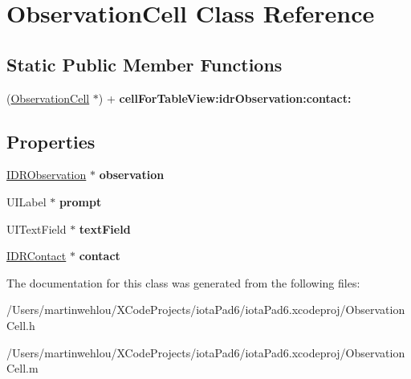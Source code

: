 \hypertarget{interface_observation_cell}{
\section{ObservationCell Class Reference}
\label{interface_observation_cell}
}
\subsection*{Static Public Member Functions}
\begin{DoxyCompactItemize}
\item 
\hypertarget{interface_observation_cell_a0782f3a18fd9c0132893a3fe97bd4f75}{
(\hyperlink{interface_observation_cell}{ObservationCell} $\ast$) + {\bfseries cellForTableView:idrObservation:contact:}}
\label{interface_observation_cell_a0782f3a18fd9c0132893a3fe97bd4f75}

\end{DoxyCompactItemize}
\subsection*{Properties}
\begin{DoxyCompactItemize}
\item 
\hypertarget{interface_observation_cell_a977713b5bbae743a84bc9bb2270003af}{
\hyperlink{interface_i_d_r_observation}{IDRObservation} $\ast$ {\bfseries observation}}
\label{interface_observation_cell_a977713b5bbae743a84bc9bb2270003af}

\item 
\hypertarget{interface_observation_cell_af7e4f5fa34235076f66ce740007808cb}{
UILabel $\ast$ {\bfseries prompt}}
\label{interface_observation_cell_af7e4f5fa34235076f66ce740007808cb}

\item 
\hypertarget{interface_observation_cell_a35e6cd213dcc07c2fd3777b1b0a86a72}{
UITextField $\ast$ {\bfseries textField}}
\label{interface_observation_cell_a35e6cd213dcc07c2fd3777b1b0a86a72}

\item 
\hypertarget{interface_observation_cell_ad3bf4dd3d5878cc7648aab33e0edb79d}{
\hyperlink{interface_i_d_r_contact}{IDRContact} $\ast$ {\bfseries contact}}
\label{interface_observation_cell_ad3bf4dd3d5878cc7648aab33e0edb79d}

\end{DoxyCompactItemize}


The documentation for this class was generated from the following files:\begin{DoxyCompactItemize}
\item 
/Users/martinwehlou/XCodeProjects/iotaPad6/iotaPad6.xcodeproj/ObservationCell.h\item 
/Users/martinwehlou/XCodeProjects/iotaPad6/iotaPad6.xcodeproj/ObservationCell.m\end{DoxyCompactItemize}
